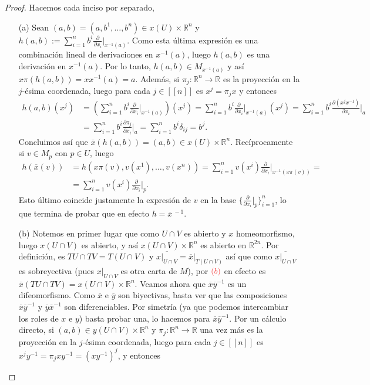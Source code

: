 \documentclass[11pt]{article}
\newcommand{\R}{\mathbb{R}}
\newcommand{\nat}[1]{[\![#1]\!]}
\newcommand{\paint}[2]{\color{#1}{#2}}
\newcommand{\ol}{\overline}
\newcommand{\hook}[3]{\frac{\partial}{\partial x_{#1}}\Big\rvert_{#2}^{#3}}
\begin{document}
\begin{proof} Hacemos cada inciso por separado,
\begin{itemize}
\item[(a)] Sean $(a,b) = (a, b^1, \dots, b^n) \in x(U) \times \R^n$ y $h(a,b) := \sum_{i=1}^nb^i \frac{\partial}{\partial x_i}|_{x^{-1}(a)}$. Como esta \'ultima expresi\'on es una combinaci\'on lineal de derivaciones en $x^{-1}(a)$, luego $h(a,b)$ es una derivaci\'on en $x^{-1}(a)$. Por lo tanto, $h(a,b) \in M_{x^{-1}(a)}$ y as\'i $x\pi(h(a,b)) = xx^{-1}(a) = a$. Adem\'as, si $\pi_j : \R^n \to \R$ es la proyecci\'on en la $j$-\'esima coordenada, luego para cada $j \in \nat{n}$ es $x^j = \pi_jx$ y entonces
\begin{align*}
h(a,b)(x^j) &= \left(\sum_{i=1}^nb^i \hook{i}{x^{-1}(a)}{} \right)(x^j) = \sum_{i=1}^nb^i \hook{i}{x^{-1}(a)}{}(x^j) = \sum_{i=1}^nb^i \frac{\partial (x^jx^{-1})}{\partial x_i}\Big|_a \\
& = \sum_{i=1}^nb^i \frac{\partial \pi_j}{\partial x_i}\Big|_a =  \sum_{i=1}^nb^i \delta_{ij} = b^j.
\end{align*}
Concluimos as\'i que $\ol{x}(h(a,b)) = (a,b) \in x(U) \times \R^n$. Rec\'iprocamente si $v \in M_p$ con $p \in U$, luego
\begin{align*}
h(\ol{x}(v)) & = h(x\pi(v),v(x^1),\dots,v(x^n)) = \sum_{i=1}^nv(x^i)\hook{i}{x^{-1}(x\pi(v))}{} = \\
& = \sum_{i=1}^nv(x^i)\hook{i}{p}{}.
\end{align*}
Esto \'ultimo coincide justamente la expresi\'on de $v$ en la base $\big\{\hook{i}{p}{}\big\}_{i=1}^n$, lo que termina de probar que en efecto $h = \ol{x}^{\ -1}$.
\item[(b)] Notemos en primer lugar que como $U \cap V$ es abierto y $x$ homeomorfismo, luego $x(U\cap V)$ es abierto, y as\'i $x(U \cap V) \times \R^n$ es abierto en $\R^{2n}$. Por definici\'on, es $TU \cap TV = T(U \cap V)$ y $\ol{x|_{U \cap V}} = \ol{x}|_{T(U \cap V)}$ as\'i que como $\ol{x|_{U \cap V}}$ es sobreyectiva (pues $x|_{U \cap V}$ es otra carta de $M$), por $\paint{red}{(b)}$ en efecto es $\ol{x}(TU \cap TV) = x(U \cap V) \times \R^n$. Veamos ahora que $\ol{x}\ol{y}^{-1}$ es un difeomorfismo. Como $\ol{x}$ e $\ol{y}$ son biyectivas, basta ver que las composiciones $\ol{x}\ol{y}^{-1}$ y $\ol{y}\ol{x}^{-1}$ son diferenciables. Por simetr\'ia (ya que podemos intercambiar los roles de $x$ e $y$) basta probar una, lo hacemos para $\ol{x}\ol{y}^{-1}$. Por un c\'alculo directo, si $(a,b) \in y(U\cap V) \times \R^n$ y $\pi_j : \R^n \to \R$ una vez m\'as es la proyecci\'on en la $j$-\'esima coordenada, luego para cada $j \in \nat{n}$ es $x^jy^{-1} = \pi_jxy^{-1} = (xy^{-1})^j$, y entonces

\end{itemize}
\end{proof}
\end{document}

